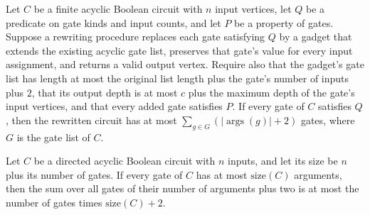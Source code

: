 \begin{theorem}
\label{BoolCircuit.DAGCircuit.rewrite_length_le}
\leanok
{}
Let $C$ be a finite acyclic Boolean circuit with $n$ input vertices, let $Q$ be a
predicate on gate kinds and input counts, and let $P$ be a property of gates. Suppose a
rewriting procedure replaces each gate satisfying $Q$ by a gadget that extends the
existing acyclic gate list, preserves that gate's value for every input assignment, and
returns a valid output vertex. Require also that the gadget's gate list has length at
most the original list length plus the gate's number of inputs plus $2$, that its output
depth is at most $c$ plus the maximum depth of the gate's input vertices, and that every
added gate satisfies $P$. If every gate of $C$ satisfies $Q$, then the rewritten circuit
has at most $\sum_{g\in G} (|\operatorname{args}(g)|+2)$ gates, where $G$ is the gate
list of $C$.
\end{theorem}

\begin{theorem}
\label{BoolCircuit.DAGCircuit.sum_cost_le}
\leanok
{}
Let $C$ be a directed acyclic Boolean circuit with $n$ inputs, and let its size be $n$
plus its number of gates. If every gate of $C$ has at most $\mathrm{size}(C)$ arguments,
then the sum over all gates of their number of arguments plus two is at most the number
of gates times $\mathrm{size}(C)+2$.
\end{theorem}
